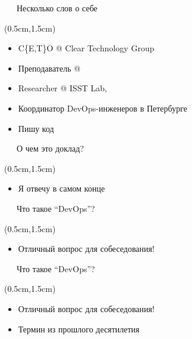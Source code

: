 \documentclass[xetex,18pt,aspectratio=43]{beamer}
\begin{document}
\begin{Large}
\begin{frame}{\ \ \ Несколько слов о себе}
\begin{textblock*}{\framewidth-0.8cm}(0.5cm,1.5cm)
\begin{itemize}
  \item C\{E,T\}O @ Clear Technology Group
  \item Преподаватель @ \href{http://avalon.ru}{\color{blue}{avalon.ru}}
  \item Researcher @ ISST Lab, \href{http://ifmo.ru}{\color{blue}{ITMO}}
  \item Координатор \href{https://meetup.com/DevOps-40}{\color{blue}{встреч}} DevOps-инженеров в Петербурге
  \item Пишу код
\end{itemize}
\end{textblock*}
\end{frame}

\begin{frame}{\ \ \ О чем это доклад?}
\begin{textblock*}{\framewidth-0.8cm}(0.5cm,1.5cm)
\begin{itemize}
  \item Я отвечу в самом конце
\end{itemize}
\end{textblock*}
\end{frame}

\begin{frame}{\ \ \ Что такое \enquote{DevOps}?}
\begin{textblock*}{\framewidth-0.8cm}(0.5cm,1.5cm)
\begin{itemize}
  \item Отличный вопрос для собеседования!
\end{itemize}
\end{textblock*}
\end{frame}

\begin{frame}{\ \ \ Что такое \enquote{DevOps}?}
\begin{textblock*}{\framewidth-0.8cm}(0.5cm,1.5cm)
\begin{itemize}
  \item Отличный вопрос для собеседования!
  \item Термин из прошлого десятилетия
\end{itemize}
\end{textblock*}
\end{frame}


\end{Large}
\end{document}
